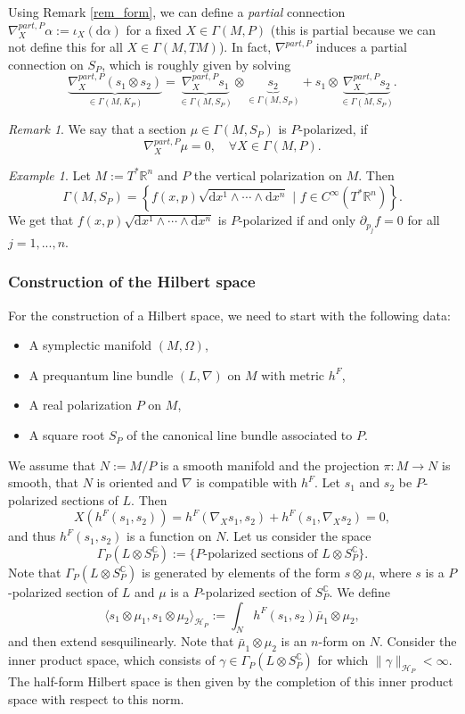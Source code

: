 \documentclass[11pt]{amsart}
\numberwithin{equation}{section}
\theoremstyle{plain}
\theoremstyle{definition}
\theoremstyle{remark}
\newtheorem{rem}{Remark}[subsection]
\newtheorem{ex}{Example}[subsection]
\newcommand{\R}{\mathbb{R}}
\newcommand{\dd}{{\mathrm{d}}}
\newcommand{\calH}{\mathcal{H}}
\begin{document}
Using Remark \ref{rem_form}, we can define a \emph{partial} connection $\nabla_X^{part,P}\alpha:=\iota_X(\dd\alpha)$ for a fixed $X\in\Gamma(M,P)$ (this is partial because we can not define this for all $X\in\Gamma(M,TM)$). In fact, $\nabla^{part,P}$ induces a partial connection on $S_P$, which is roughly given by solving 
$$\underbrace{\nabla_X^{part,P}(s_1\otimes s_2)}_{\in\Gamma(M,K_P)}=\underbrace{\nabla_X^{part,P}s_1}_{\in\Gamma(M,S_P)}\otimes \underbrace{s_2}_{\in\Gamma(M,S_P)}+s_1\otimes\underbrace{\nabla_X^{part,P} s_2}_{\in\Gamma(M,S_P)}.$$

\begin{rem}
We say that a section $\mu\in\Gamma(M,S_P)$ is $P$-polarized, if 
\[
\nabla_X^{part,P}\mu=0,\quad \forall X\in \Gamma(M,P).
\]
\end{rem}


\begin{ex}
Let $M:=T^*\R^n$ and $P$ the vertical polarization on $M$. Then $$\Gamma(M,S_P)=\left\{f(x,p)\sqrt{\dd x^1\land\dotsm\land \dd x^n}\,\,\big|\,\, f\in C^\infty(T^*\R^n)\right\}.$$ We get that $f(x,p)\sqrt{\dd x^1\land\dotsm \land\dd x^n}$ is $P$-polarized if and only $\partial_{p_j}f=0$ for all $j=1,...,n$.
\end{ex}


\subsubsection{Construction of the Hilbert space}
For the construction of a Hilbert space, we need to start with the following data:
\begin{itemize}
\item{A symplectic manifold $(M,\Omega)$,}
\item{A prequantum line bundle $(L,\nabla)$ on $M$ with metric $h^F$,}
\item{A real polarization $P$ on $M$,}
\item{A square root $S_P$ of the canonical line bundle associated to $P$.}
\end{itemize}
We assume that $N:=M/P$ is a smooth manifold and the projection $\pi\colon M\to N$ is smooth, that $N$ is oriented and $\nabla$ is compatible with $h^F$. Let $s_1$ and $s_2$ be $P$-polarized sections of $L$. Then 
$$X\left(h^F(s_1,s_2)\right)=h^F(\nabla_Xs_1,s_2)+h^F(s_1,\nabla_Xs_2)=0,$$
and thus $h^F(s_1,s_2)$ is a function on $N$. Let us consider the space 
$$\Gamma_P(L\otimes S_P^\mathbb{C}):=\{\text{$P$-polarized sections of $L\otimes S_P^\mathbb{C}$}\}.$$
Note that $\Gamma_P(L\otimes S_P^\mathbb{C})$ is generated by elements of the form $s\otimes\mu$, where $s$ is a $P$-polarized section of $L$ and $\mu$ is a $P$-polarized section of $S_P^\mathbb{C}$. We define 
\[
\langle s_1\otimes\mu_1,s_1\otimes \mu_2\rangle_{\calH_P}:=\int_Nh^F(s_1,s_2)\bar\mu_1\otimes\mu_2,
\]
and then extend sesquilinearly. Note that $\bar\mu_1\otimes\mu_2$ is an $n$-form on $N$. Consider the inner product space, which consists of $\gamma\in\Gamma_P(L\otimes S_P^\mathbb{C})$ for which $\|\gamma\|_{\calH_P}<\infty$. The half-form Hilbert space is then given by the completion of this inner product space with respect to this norm.
\end{document}
